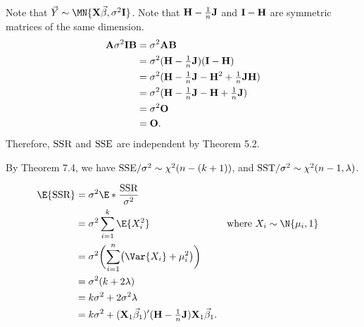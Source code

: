 \begin{Theorem}{}{}
\begin{enumerate}[(1)]
\begin{align*}
              \end{align*}
              Note that $ \Vector{Y}\sim \MN{\Matrix{X}\Vector{\beta},\sigma^2 \Matrix{I}} $. Note that $ \mathbf{H}-\tfrac{1}{n}\mathbf{J} $
              and $ \mathbf{I}-\mathbf{H} $ are symmetric matrices of the same dimension.
              \begin{align*}
                  \mathbf{A}\sigma^2 \mathbf{I}\mathbf{B}
                   & =\sigma^2 \mathbf{A}\mathbf{B}                                                             \\
                   & =\sigma^2 (\mathbf{H}-\tfrac{1}{n}\mathbf{J})(\mathbf{I}-\mathbf{H})                       \\
                   & =\sigma^2(\mathbf{H}-\tfrac{1}{n}\mathbf{J}-\mathbf{H}^2+\tfrac{1}{n}\mathbf{J}\mathbf{H}) \\
                   & =\sigma^2(\mathbf{H}-\tfrac{1}{n}\mathbf{J}-\mathbf{H}+\tfrac{1}{n}\mathbf{J})             \\
                   & =\sigma^2 \mathbf{O}                                                                       \\
                   & =\mathbf{O}.
              \end{align*}
              Therefore, $ \text{SSR} $ and $ \text{SSE} $ are independent by Theorem 5.2.
    \end{enumerate}
\end{Theorem}
\begin{Remark}{}{}
    By Theorem 7.4, we have $ \text{SSE}/\sigma^2 \sim \chi^2(n-(k+1)) $, and
    $ \text{SST}/\sigma^2 \sim \chi^2(n-1,\lambda) $.
\end{Remark}
\begin{Remark}{}{}
    \begin{align*}
        \E{\SSR}
         & =\sigma^2\E*{\frac{\SSR}{\sigma^2}}                                                                                                                     \\
         & =\sigma^2 \sum_{i=1}^{k}\E{X_i^2}                                                                            &  & \text{where $ X_i \sim \N{\mu_i,1} $} \\
         & =\sigma^2\biggl(\sum_{i=1}^{n}\bigl(\Var{X_i}+\mu_i^2\bigr)\biggr)                                                                                      \\
         & =\sigma^2(k+2\lambda)                                                                                                                                   \\
         & =k\sigma^2+2\sigma^2\lambda                                                                                                                             \\
         & =k\sigma^2+(\Matrix{X}_1 \Vector{\beta}_1)'(\Matrix{H}-\tfrac{1}{n}\Matrix{J})\Matrix{X}_1 \Vector{\beta}_1.
    \end{align*}
\end{Remark}
